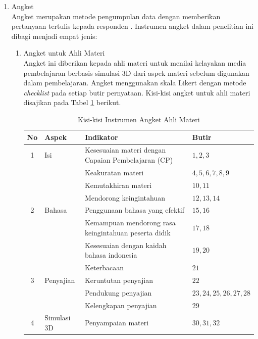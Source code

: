 \begin{enumerate}
\begin{enumerate}
        \item Angket\\
        \hspace*{1cm}Angket merupakan metode pengumpulan data dengan memberikan pertanyaan tertulis kepada responden \citep{sugiyono2018}. Instrumen angket dalam penelitian ini dibagi menjadi empat jenis:
        \begin{enumerate}
            \item Angket untuk Ahli Materi\\
            \hspace*{1cm}Angket ini diberikan kepada ahli materi untuk menilai kelayakan media pembelajaran berbasis simulasi 3D dari aspek materi sebelum digunakan dalam pembelajaran. Angket menggunakan skala Likert dengan metode \textit{checklist} pada setiap butir pernyataan. Kisi-kisi angket untuk ahli materi disajikan pada Tabel \ref{kisiahlimateri} berikut.
            \begin{table}[H]
                \centering
                \caption{Kisi-kisi Instrumen Angket Ahli Materi}
                \label{kisiahlimateri}
                \begin{tabular}{|c|p{2.5cm}|p{6cm}|p{3.5cm}|}
                    \hline
                    \textbf{No} & \textbf{Aspek} & \textbf{Indikator} & \textbf{Butir}\\
                    \hline
                    1 & Isi & Kesesuaian materi dengan Capaian Pembelajaran (CP) & \(1,2,3\)\\
                    & & Keakuratan materi & \(4,5,6,7,8,9\)\\
                    & & Kemutakhiran materi & \(10,11\)\\
                    & & Mendorong keingintahuan & \(12,13,14\)\\
                    \hline
                    2 & Bahasa & Penggunaan bahasa yang efektif & \(15,16\)\\
                    & & Kemampuan mendorong rasa keingintahuan peserta didik & \(17,18\)\\
                    & & Kesesuaian dengan kaidah bahasa indonesia & \(19,20\)\\
                    & & Keterbacaan & \(21\)\\
                    \hline
                    3 & Penyajian & Keruntutan penyajian & \(22\)\\
                    & & Pendukung penyajian & \(23,24,25,26,27,28\)\\
                    & & Kelengkapan penyajian & \(29\)\\
                    \hline
                    4 & Simulasi 3D & Penyampaian materi & \(30,31,32\)\\
                    \hline
                

\end{tabular}
\end{table}
\end{enumerate}
\end{enumerate}
\end{enumerate}
